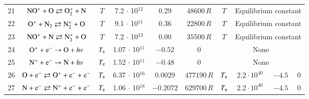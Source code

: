 \documentclass{warpdoc}
\begin{document}
\begin{table}[t]
\begin{center}
\begin{threeparttable}
\begin{tabular}{cccccccccc}
21 & $\rm NO^+ + O \rightleftarrows O_2^+ + N $ & $T$   & 7.2 $\cdot$ 10$^{12}$  & 0.29 & $48600 \, R$ & $T$ & \multicolumn{3}{c}{Equilibrium constant}\\

22 & $\rm O^+ + N_2 \rightleftarrows N_2^+ + O $ & $T$  & 9.1 $\cdot$ 10$^{11}$  & 0.36 & $22800 \, R$ & $T$  & \multicolumn{3}{c}{Equilibrium constant}\\

23 & $\rm NO^+ + N \rightleftarrows N_2^+ + O $  & $T$  & 7.2 $\cdot$ 10$^{13}$  & 0.00 & $35500 \, R$ & $T$ & \multicolumn{3}{c}{Equilibrium constant}\\



24 & $\rm O^+ + e^- \rightarrow O + {\it hv} $ & $T_{\rm e}$  & 1.07 $\cdot$ 10$^{11}$  & $-0.52$ & $0$ &  \multicolumn{4}{c}{None}\\
25 & $\rm N^+ + e^- \rightarrow N + {\it hv} $ & $T_{\rm e}$  & 1.52 $\cdot$ 10$^{11}$  & $-0.48$ & $0$ &  \multicolumn{4}{c}{None}\\


26 & $\rm O + e^- \rightleftarrows O^+ + e^- + e^- $ & $T_{\rm e}$  & 6.37 $\cdot$ 10$^{16}$  & $0.0029$ & $477190 \, R$ & $T_{\rm e}$ & $2.2\cdot 10^{40}$ & $-4.5$ & 0\\

27 & $\rm N + e^- \rightleftarrows N^+ + e^- + e^- $ & $T_{\rm e}$  & 1.06 $\cdot$ 10$^{18}$  & $-0.2072$ & $629700 \, R$ & $T_{\rm e}$ & $2.2\cdot 10^{40}$ & $-4.5$ & 0\\


\end{tabular}
\end{threeparttable}
\end{center}
\end{table}
\end{document}
